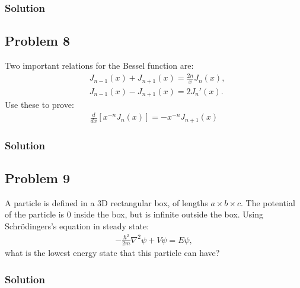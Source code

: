 \subsubsection*{Solution}

\subsection*{Problem 8}
Two important relations for the Bessel function are:
\begin{align*}
    &J_{n-1}(x) + J_{n+1}(x) = \frac{2n}{x}J_n(x),\\
    &J_{n-1}(x) - J_{n+1}(x) = 2J_n'(x).
\end{align*}Use these to prove:
\begin{align*}
    \frac{d}{dx}\left[x^{-n}J_n(x)\right] = -x^{-n}J_{n + 1}(x)
\end{align*}

\subsubsection*{Solution}

\subsection*{Problem 9}
A particle is defined in a 3D rectangular box, of lengths $a \times b \times c$. The potential of the particle is 0 inside the box, but is infinite outside the box.
Using Schrödingers's equation in steady state:
\begin{align*}
    -\frac{\hbar^2}{2m}\nabla^2\psi + V\psi= E\psi,
\end{align*}what is the lowest energy state that this particle can have?

\subsubsection*{Solution}
